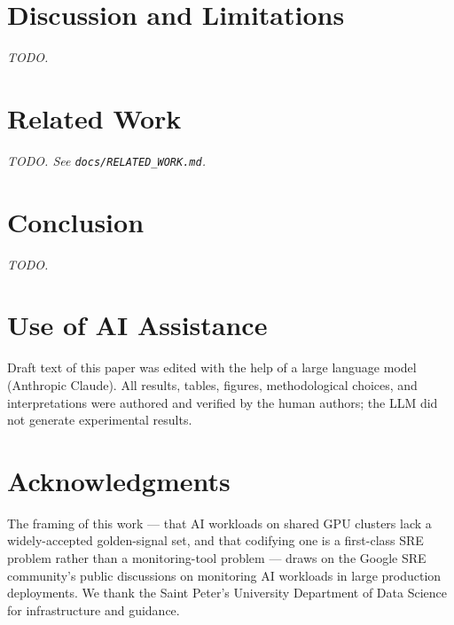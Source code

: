 \documentclass[11pt]{article}
\begin{document}
\section{Discussion and Limitations}\label{sec:disc}
\emph{TODO.}

\section{Related Work}\label{sec:rw}
\emph{TODO. See \texttt{docs/RELATED\_WORK.md}.}

\section{Conclusion}\label{sec:conc}
\emph{TODO.}

\section*{Use of AI Assistance}
Draft text of this paper was edited with the help of a large language model
(Anthropic Claude). All results, tables, figures, methodological choices,
and interpretations were authored and verified by the human authors; the
LLM did not generate experimental results.

\section*{Acknowledgments}
The framing of this work --- that AI workloads on shared GPU clusters
lack a widely-accepted golden-signal set, and that codifying one is a
first-class SRE problem rather than a monitoring-tool problem ---
draws on the Google SRE community's public discussions on monitoring
AI workloads in large production deployments. We thank the Saint
Peter's University Department of Data Science for infrastructure and
guidance.
\end{document}
